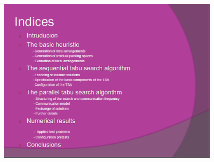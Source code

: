 \documentclass{beamer}
\begin{document}
\begin{frame}
\frametitle{ }
\begin{figure}[!th]
\begin{center}
\includegraphics[width=1\textwidth]{img/picn1.eps}
\end{center}
\end{figure}
\end{frame}
\end{document}
